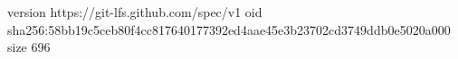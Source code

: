 version https://git-lfs.github.com/spec/v1
oid sha256:58bb19c5ceb80f4cc817640177392ed4aae45e3b23702cd3749ddb0e5020a000
size 696
